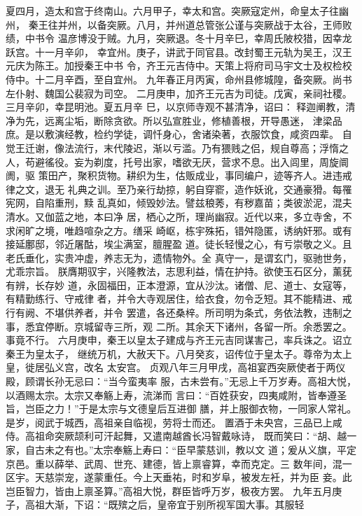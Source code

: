 \documentclass[12pt,UTF8]{ctexbook}
\begin{document}
夏四月，造太和宫于终南山。六月甲子，幸太和宫。突厥寇定州，命皇太子往幽州，
秦王往并州，以备突厥。八月，并州道总管张公谨与突厥战于太谷，王师败绩，中书令
温彦博没于贼。九月，突厥退。冬十月辛巳，幸周氏陂校猎，因幸龙跃宫。十一月辛卯，
幸宜州。庚子，讲武于同官县。改封蜀王元轨为吴王，汉王元庆为陈王。加授秦王中书
令，齐王元吉侍中。天策上将府司马宇文士及权检校侍中。十二月辛酉，至自宜州。
九年春正月丙寅，命州县修城隍，备突厥。尚书左仆射、魏国公裴寂为司空。
二月庚申，加齐王元吉为司徒。戊寅，亲祠社稷。三月辛卯，幸昆明池。夏五月辛
巳，以京师寺观不甚清净，诏曰：
释迦阐教，清净为先，远离尘垢，断除贪欲。所以弘宣胜业，修植善根，开导愚迷，
津梁品庶。是以敷演经教，检约学徒，调忏身心，舍诸染著，衣服饮食，咸资四辈。
自觉王迁谢，像法流行，末代陵迟，渐以亏滥。乃有猥贱之侣，规自尊高；浮惰之
人，苟避徭役。妄为剃度，托号出家，嗜欲无厌，营求不息。出入闾里，周旋阛阓，驱
策田产，聚积货物。耕织为生，估贩成业，事同编户，迹等齐人。进违戒律之文，退无
礼典之训。至乃亲行劫掠，躬自穿窬，造作妖讹，交通豪猾。每罹宪网，自陷重刑，黩
乱真如，倾毁妙法。譬兹稂莠，有秽嘉苗；类彼淤泥，混夫清水。又伽蓝之地，本曰净
居，栖心之所，理尚幽寂。近代以来，多立寺舍，不求闲旷之境，唯趋喧杂之方。缮采
崎岖，栋宇殊拓，错舛隐匿，诱纳奸邪。或有接延鄽邸，邻近屠酤，埃尘满室，膻腥盈
道。徒长轻慢之心，有亏崇敬之义。且老氏垂化，实贵冲虚，养志无为，遗情物外。全
真守一，是谓玄门，驱驰世务，尤乖宗旨。
朕膺期驭宇，兴隆教法，志思利益，情在护持。欲使玉石区分，薰莸有辨，长存妙
道，永固福田，正本澄源，宜从沙汰。诸僧、尼、道士、女寇等，有精勤练行、守戒律
者，并令大寺观居住，给衣食，勿令乏短。其不能精进、戒行有阙、不堪供养者，并令
罢遣，各还桑梓。所司明为条式，务依法教，违制之事，悉宜停断。京城留寺三所，观
二所。其余天下诸州，各留一所。余悉罢之。事竟不行。
六月庚申，秦王以皇太子建成与齐王元吉同谋害己，率兵诛之。诏立秦王为皇太子，
继统万机，大赦天下。八月癸亥，诏传位于皇太子。尊帝为太上皇，徙居弘义宫，改名
太安宫。
贞观八年三月甲戌，高祖宴西突厥使者于两仪殿，顾谓长孙无忌曰：“当今蛮夷率
服，古未尝有。”无忌上千万岁寿。高祖大悦，以酒赐太宗。太宗又奉觞上寿，流涕而
言曰：“百姓获安，四夷咸附，皆奉遵圣旨，岂臣之力！”于是太宗与文德皇后互进御
膳，并上服御衣物，一同家人常礼。是岁，阅武于城西，高祖亲自临视，劳将士而还。
置酒于未央宫，三品已上咸侍。高祖命突厥颉利可汗起舞，又遣南越酋长冯智戴咏诗，
既而笑曰：“胡、越一家，自古未之有也。”太宗奉觞上寿曰：“臣早蒙慈训，教以文
道；爰从义旗，平定京邑。重以薛举、武周、世充、建德，皆上禀睿算，幸而克定。三
数年间，混一区宇。天慈崇宠，遂蒙重任。今上天垂祐，时和岁阜，被发左衽，并为臣
妾。此岂臣智力，皆由上禀圣算。”高祖大悦，群臣皆呼万岁，极夜方罢。
九年五月庚子，高祖大渐，下诏：“既殡之后，皇帝宜于别所视军国大事。其服轻
\end{document}
